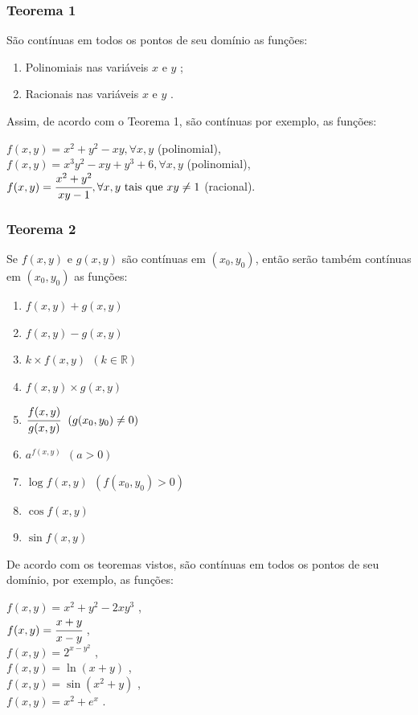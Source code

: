 		\subsubsection{Teorema 1 \cite{morettin}}

			São contínuas em todos os pontos de seu domínio as funções:

			\begin{enumerate}[label=(\alph*)]

				\item Polinomiais nas variáveis $x$ e $y$ ;
				\item Racionais nas variáveis $x$ e $y$ .

			\end{enumerate}

			Assim, de acordo com o Teorema 1, são contínuas por exemplo, as funções:

			\bigskip

			$f(x, y) = x^{2} + y^{2} - xy, \forall x, y$ (polinomial), \\
			$f(x, y) = x^{3}y^{2} - xy + y^{3} +6, \forall x, y$ (polinomial), \\
			$f(x, y) = \cfrac{x^{2} + y^{2}}{xy - 1}, \forall x, y \ \text{tais que} \ xy \neq 1$ (racional).
			
		\subsubsection{Teorema 2 \cite{morettin}}

			Se $f(x, y)$ e $g(x, y)$ são contínuas em $(x_{0}, y_{0})$, então serão também contínuas em $(x_{0}, y_{0})$ as funções:

			\begin{enumerate}[label=(\alph*)]

				\item $f(x, y) + g(x, y)$
				\item $f(x, y) - g(x, y)$
				\item $k \times f(x, y) \ \ (k \in \mathbb{R})$
				\item $f(x, y) \times g(x, y)$
				\item $\cfrac{f(x, y)}{g(x, y)} \ \ (g(x_{0}, y_{0}) \neq 0)$
				\item $a^{f(x, y)} \ \ (a > 0)$
				\item $\log f(x, y) \ \ (f(x_{0}, y_{0}) > 0)$
				\item $\cos f(x, y)$
				\item $\sin f(x, y)$

			\end{enumerate}

			De acordo com os teoremas vistos, são contínuas em todos os pontos de seu domínio, por exemplo, as funções:

			$f(x, y) = x^{2} + y^{2} - 2xy^{3}$ ,\\
			$f(x, y) = \cfrac{x + y}{x - y}$ ,\\
			$f(x, y) = 2^{x - y^{2}}$ ,\\
			$f(x, y) = \ln (x + y)$ ,\\
			$f(x, y) = \sin (x^{2} + y)$ ,\\
			$f(x, y) = x^{2} + e^{x}$ .